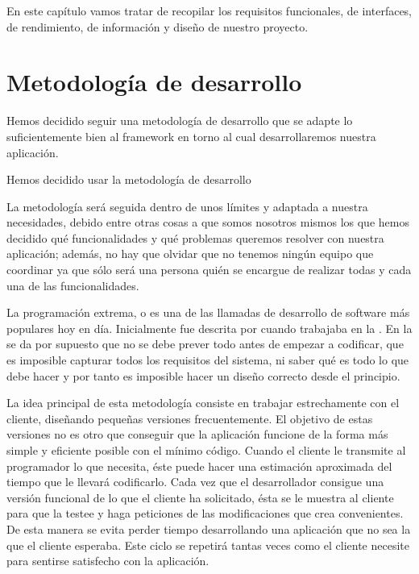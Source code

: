 
En este capítulo vamos tratar de recopilar los requisitos funcionales, de
interfaces, de rendimiento, de información y diseño  de nuestro proyecto. 

\section{Metodología de desarrollo}
Hemos decidido seguir una metodología de desarrollo que se adapte lo
suficientemente bien al framework en torno al cual desarrollaremos nuestra
aplicación.

Hemos decidido usar la metodología de desarrollo 

La metodología será seguida dentro de unos límites y adaptada a nuestra
necesidades, debido entre otras cosas a que somos nosotros mismos los que hemos
decidido qué funcionalidades y qué problemas queremos resolver con nuestra
aplicación; además, no hay que olvidar que no tenemos ningún equipo que
coordinar ya que sólo será una persona quién se encargue de realizar todas y
cada una de las funcionalidades.

La programación extrema, o  es una de las llamadas
 de desarrollo de software más populares hoy en
día. Inicialmente fue descrita por  cuando trabajaba en la
. En la  se da por supuesto que no se
debe prever todo antes de empezar a codificar, que es imposible capturar todos
los requisitos del sistema, ni saber qué es todo lo que debe hacer y por tanto
es imposible hacer un diseño correcto desde el principio.

La idea principal de esta metodología consiste en trabajar estrechamente con el
cliente, diseñando pequeñas versiones frecuentemente. El objetivo de estas
versiones no es otro que conseguir que la aplicación funcione de la forma más
simple y eficiente posible con el mínimo código. Cuando el cliente le transmite
al programador lo que necesita, éste puede hacer una estimación aproximada del
tiempo que le llevará codificarlo. Cada vez que el desarrollador consigue una versión
funcional de lo que el cliente ha solicitado, ésta se le muestra al cliente para
que la testee y haga peticiones de las modificaciones que crea convenientes. De
esta manera se evita perder tiempo desarrollando una aplicación que no sea la
que el cliente esperaba. Este ciclo se repetirá tantas veces como el cliente
necesite para sentirse satisfecho con la aplicación.

